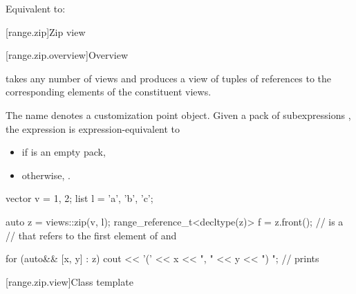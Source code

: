 \begin{itemdescr}
\pnum
\effects
Equivalent to: 
\end{itemdescr}

[range.zip]{Zip view}

[range.zip.overview]{Overview}

\pnum
{}%
 takes any number of views and
produces a view of tuples of references
to the corresponding elements of the constituent views.

\pnum
{}%
The name  denotes
a customization point object.
Given a pack of subexpressions ,
the expression  is expression-equivalent to
\begin{itemize}
\item
{}
if  is an empty pack,
\item
otherwise, .
\end{itemize}

\begin{example}
\begin{codeblock}
vector v = {1, 2};
list l = {'a', 'b', 'c'};

auto z = views::zip(v, l);
range_reference_t<decltype(z)> f = z.front();   //  is a 
                                                // that refers to the first element of  and 

for (auto&& [x, y] : z) {
  cout << '(' << x << ", " << y << ") ";        // prints 
}
\end{codeblock}
\end{example}

[range.zip.view]{Class template }

